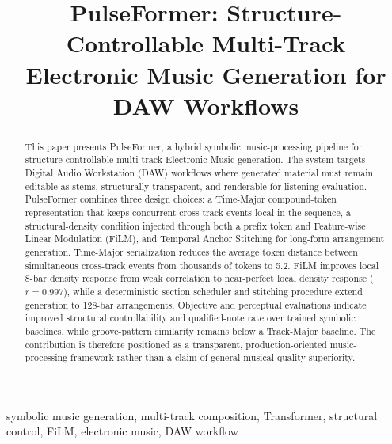 \documentclass[conference]{conference-latex-template_10-17-19/IEEEtran}
\begin{document}
\title{PulseFormer: Structure-Controllable Multi-Track Electronic Music Generation for DAW Workflows}

\author{
\and
{}
}

\maketitle

\begin{abstract}
This paper presents PulseFormer, a hybrid symbolic music-processing pipeline for structure-controllable multi-track Electronic Music generation. The system targets Digital Audio Workstation (DAW) workflows where generated material must remain editable as stems, structurally transparent, and renderable for listening evaluation. PulseFormer combines three design choices: a Time-Major compound-token representation that keeps concurrent cross-track events local in the sequence, a structural-density condition injected through both a prefix token and Feature-wise Linear Modulation (FiLM), and Temporal Anchor Stitching for long-form arrangement generation. Time-Major serialization reduces the average token distance between simultaneous cross-track events from thousands of tokens to 5.2. FiLM improves local 8-bar density response from weak correlation to near-perfect local density response ($r=0.997$), while a deterministic section scheduler and stitching procedure extend generation to 128-bar arrangements. Objective and perceptual evaluations indicate improved structural controllability and qualified-note rate over trained symbolic baselines, while groove-pattern similarity remains below a Track-Major baseline. The contribution is therefore positioned as a transparent, production-oriented music-processing framework rather than a claim of general musical-quality superiority.
\end{abstract}

\begin{IEEEkeywords}
symbolic music generation, multi-track composition, Transformer, structural control, FiLM, electronic music, DAW workflow
\end{IEEEkeywords}
\end{document}
